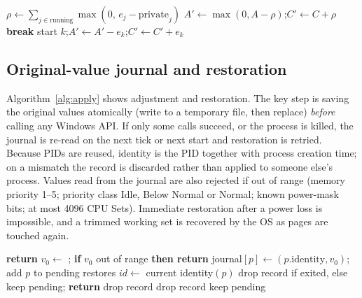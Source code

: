 \documentclass[11pt]{article}
\begin{document}
\begin{algorithm}[t]
\caption{Background-job admission (every 2\,s)}
\label{alg:queue}
\small
\begin{algorithmic}[1]
\State $\rho \gets \sum_{j\in\text{running}} \max(0,\, e_j - \text{private}_j)$ 
\State $A' \gets \max(0, A - \rho)$;\quad $C' \gets C + \rho$
   \State \textbf{break}  \EndIf
  \State start $k$;\quad $A' \gets A' - e_k$;\quad $C' \gets C' + e_k$
\EndWhile
\end{algorithmic}
\end{algorithm}

\subsection{Original-value journal and restoration}
\label{sec:journal}
Algorithm~\ref{alg:apply} shows adjustment and restoration. The key step is saving the original values atomically (write to a temporary file, then replace) \emph{before} calling any Windows API. If only some calls succeed, or the process is killed, the journal is re-read on the next tick or next start and restoration is retried. Because PIDs are reused, identity is the PID together with process creation time; on a mismatch the record is discarded rather than applied to someone else's process. Values read from the journal are also rejected if out of range (memory priority 1--5; priority class Idle, Below Normal or Normal; known power-mask bits; at most 4096 CPU Sets). Immediate restoration after a power loss is impossible, and a trimmed working set is recovered by the OS as pages are touched again.

\begin{algorithm}[t]
\caption{Reversible adjustment and restoration}
\label{alg:apply}
\small
\begin{algorithmic}[1]
   \State \textbf{return} \EndIf
  \State $v_0 \gets$ ; \textbf{if} $v_0$ out of range \textbf{then return}
  \State journal$[p] \gets (p.\text{identity}, v_0)$;  
   \State add $p$ to pending restores \EndIf
\EndProcedure
{}
  \State $id \gets$ current identity$(p)$
   \State drop record if exited, else keep pending; \textbf{return} \EndIf
   \State drop record 
   \State drop record
  \Else \State keep pending \EndIf
\EndProcedure
\end{algorithmic}
\end{algorithm}
\end{document}

